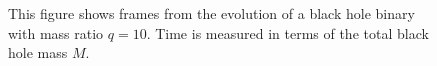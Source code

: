 \begin{figure}
	
	\begin{minipage}{0.32\linewidth}
	\end{minipage}
	\begin{minipage}{0.32\linewidth}
	\end{minipage}
	\begin{minipage}{0.32\linewidth}
	\end{minipage} \hfill
	

	\caption{This figure shows frames from the evolution of a black hole
binary with mass ratio $q=10$. Time is measured in terms of the total
black hole mass $M$.\label{fig:r10}}
\end{figure}




